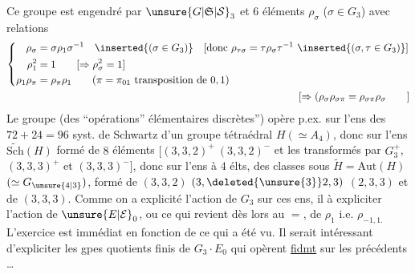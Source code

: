 Ce groupe est engendré par ${\unsure{G|\mathfrak S|\mathcal S}}_3$ et $6$ éléments $\rho_\sigma$ ($\sigma\in G_3$) \deleted{$\rho_\sigma=\sigma$} avec relations
\[
\begin{aligned}
\left\{\begin{aligned}
\rho_\sigma&=\sigma\rho_1\sigma^{-1}\quad\inserted{(\sigma\in G_3)}
  \quad[\text{donc }\rho_{\tau\sigma}=\tau\rho_\sigma\tau^{-1}\ \inserted{(\sigma,\tau\in G_3)}]\\
\rho_1^2&=1\qquad [\Rightarrow \rho_\sigma^2=1]\\
\rho_1\rho_\pi&=\rho_\pi\rho_1\qquad(\pi=\pi_{01}\ \text{transposition de }0,1)
\end{aligned}\right.\\
[\Rightarrow(\rho_\sigma\rho_{\sigma\pi}=\rho_{\sigma\pi}\rho_\sigma\qquad]
\end{aligned}
\]
Le groupe  (des ``opérations'' élémentaires discrètes'') opère p.ex. sur l'ens des $72+24=96$ syst. de Schwartz  d'un groupe tétraédral $H(\simeq A_4)$, donc sur l'ens $\widetilde{\mathrm{Sch}}(H)$ formé de $8$ éléments $[(3,3,2)^+\ (3,3,2)^-$ et les transformés par $G_3^+$, $(3,3,3)^+$ et $(3,3,3)^-]$, donc sur l'ens à $4$ élts, des classes sous  $\widetilde H=\mathrm{Aut}(H)$ $(\simeq G_{\unsure{4|3}})$, formé de $(3,3,2)$ $(3,\deleted{\unsure{3}}2,3)$ $(2,3,3)$ et de $(3,3,3)$. Comme on a explicité l'action de $G_3$ sur ces ens, il  à expliciter l'action de $\unsure{E|\mathcal E}_0$, ou ce qui revient dès lors au $=$, de $\rho_1$ i.e. $\rho_{-1,1.}$ L'exercice est immédiat en fonction de ce qui a été vu.  Il serait intéressant d'expliciter les gpes quotients finis de $G_3\cdot E_0$ qui opèrent \uline{fidmt} sur les  précédents \ldots
